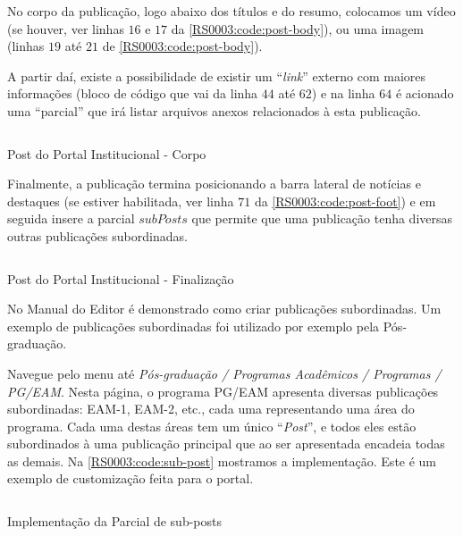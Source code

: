No corpo da publicação, logo abaixo dos títulos e do resumo, colocamos um vídeo (se houver, ver linhas $16$ e $17$ da \cref{RS0003:code:post-body}), ou uma imagem (linhas $19$ até $21$ de \cref{RS0003:code:post-body}).

A partir daí, existe a possibilidade de existir um ``\textit{link}'' externo com maiores informações (bloco de código que vai da linha $44$ até $62$) e na linha $64$ é acionado uma ``parcial'' que irá listar arquivos anexos relacionados à esta publicação.

\begin{code}
    \inputminted[label=post.handlebars,firstline=13,lastline=65]{HTML}{../RS0003/anexos/post.handlebars}
    \caption{Post do Portal Institucional - Corpo}\label{RS0003:code:post-body}
\end{code}

Finalmente, a publicação termina posicionando a barra lateral de notícias e destaques (se estiver habilitada, ver linha $71$ da \cref{RS0003:code:post-foot}) e em seguida insere a parcial $subPosts$ que permite que uma publicação tenha diversas outras publicações subordinadas.

\begin{code}
    \inputminted[label=post.handlebars,firstline=66,lastline=92]{HTML}{../RS0003/anexos/post.handlebars}
    \caption{Post do Portal Institucional - Finalização}\label{RS0003:code:post-foot}
\end{code}

No Manual do Editor é demonstrado como criar publicações subordinadas. Um exemplo de publicações subordinadas foi utilizado por exemplo pela Pós-graduação.

Navegue pelo menu até \textit{Pós-graduação / Programas Acadêmicos / Programas / PG/EAM}. Nesta página, o programa PG/EAM apresenta diversas publicações subordinadas: EAM-1, EAM-2, etc., cada uma representando uma área do programa. Cada uma destas áreas tem um único ``\textit{Post}'', e todos eles estão subordinados à uma publicação principal que ao ser apresentada encadeia todas as demais. Na \cref{RS0003:code:sub-post} mostramos a implementação. Este é um exemplo de customização feita para o portal.

\begin{code}
    \inputminted[label=subPosts.handlebars]{HTML}{../RS0003/anexos/subPosts.handlebars}
    \caption{Implementação da Parcial de sub-posts}\label{RS0003:code:sub-post}
\end{code}

